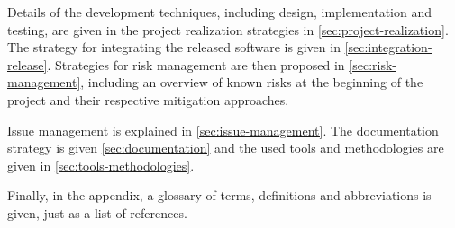Details of the development techniques, including design, implementation and testing, are given in the project realization strategies in \autoref{sec:project-realization}.
The strategy for integrating the released software is given in \autoref{sec:integration-release}.
Strategies for risk management are then proposed in \autoref{sec:risk-management}, including an overview of known risks  at the beginning of the project and their respective mitigation approaches.

Issue management is explained in \autoref{sec:issue-management}.
The documentation strategy is given \autoref{sec:documentation} and the used tools and methodologies are given in \autoref{sec:tools-methodologies}.

Finally, in the appendix, a glossary of terms, definitions and abbreviations is given, just as a list of references.

